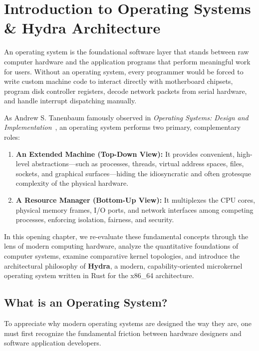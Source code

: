 \chapter{Introduction to Operating Systems \& Hydra Architecture}
\label{chap:introduction}

An operating system is the foundational software layer that stands between raw computer hardware and the application programs that perform meaningful work for users. Without an operating system, every programmer would be forced to write custom machine code to interact directly with motherboard chipsets, program disk controller registers, decode network packets from serial hardware, and handle interrupt dispatching manually.

As Andrew S. Tanenbaum famously observed in \textit{Operating Systems: Design and Implementation}~\cite{tanenbaum2006operating}, an operating system performs two primary, complementary roles:
\begin{enumerate}
    \item \textbf{An Extended Machine (Top-Down View):} It provides convenient, high-level abstractions---such as processes, threads, virtual address spaces, files, sockets, and graphical surfaces---hiding the idiosyncratic and often grotesque complexity of the physical hardware.
    \item \textbf{A Resource Manager (Bottom-Up View):} It multiplexes the CPU cores, physical memory frames, I/O ports, and network interfaces among competing processes, enforcing isolation, fairness, and security.
\end{enumerate}

In this opening chapter, we re-evaluate these fundamental concepts through the lens of modern computing hardware, analyze the quantitative foundations of computer systems, examine comparative kernel topologies, and introduce the architectural philosophy of \textbf{Hydra}, a modern, capability-oriented microkernel operating system written in Rust for the x86\_64 architecture.

\section{What is an Operating System?}
\label{sec:what_is_os}

To appreciate why modern operating systems are designed the way they are, one must first recognize the fundamental friction between hardware designers and software application developers.

